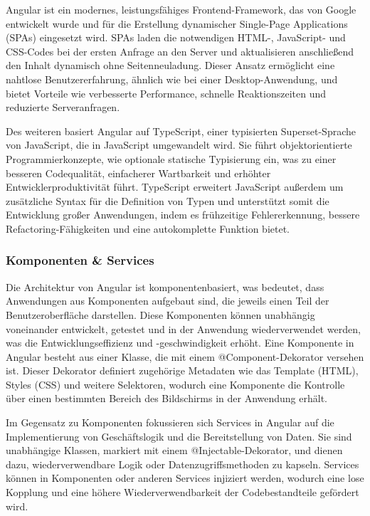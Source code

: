 \documentclass[../main.tex]{subfiles} %
\begin{document}
Angular ist ein modernes, leistungsfähiges Frontend-Framework, das von Google entwickelt wurde und für die Erstellung dynamischer Single-Page 
Applications (SPAs) eingesetzt wird. SPAs laden die notwendigen HTML-, JavaScript- und CSS-Codes bei der ersten Anfrage an den Server und 
aktualisieren anschließend den Inhalt dynamisch ohne Seitenneuladung. Dieser Ansatz ermöglicht eine nahtlose Benutzererfahrung, ähnlich wie bei 
einer Desktop-Anwendung, und bietet Vorteile wie verbesserte Performance, schnelle Reaktionszeiten und reduzierte Serveranfragen.

Des weiteren basiert Angular auf TypeScript, einer typisierten Superset-Sprache von JavaScript, die in JavaScript umgewandelt wird. Sie führt 
objektorientierte Programmierkonzepte, wie optionale statische Typisierung ein, was zu einer besseren Codequalität, einfacherer Wartbarkeit und 
erhöhter Entwicklerproduktivität führt. TypeScript erweitert JavaScript außerdem um zusätzliche Syntax für die Definition von Typen und unterstützt 
somit die Entwicklung großer Anwendungen, indem es frühzeitige Fehlererkennung, bessere Refactoring-Fähigkeiten und eine autokomplette Funktion bietet.

\subsubsection{Komponenten \& Services}

Die Architektur von Angular ist komponentenbasiert, was bedeutet, dass Anwendungen aus Komponenten aufgebaut sind, die
jeweils einen Teil der Benutzeroberfläche darstellen. Diese Komponenten können unabhängig voneinander entwickelt, getestet und in der
Anwendung wiederverwendet werden, was die Entwicklungseffizienz und -geschwindigkeit erhöht. Eine Komponente in Angular besteht aus einer 
Klasse, die mit einem @Component-Dekorator versehen ist. Dieser Dekorator definiert zugehörige Metadaten wie das Template (HTML), Styles (CSS) 
und weitere Selektoren, wodurch eine Komponente die Kontrolle über einen bestimmten Bereich des Bildschirms in der Anwendung erhält.

Im Gegensatz zu Komponenten fokussieren sich Services in Angular auf die Implementierung von Geschäftslogik und die Bereitstellung von Daten. 
Sie sind unabhängige Klassen, markiert mit einem @Injectable-Dekorator, und dienen dazu, wiederverwendbare Logik oder Datenzugriffsmethoden zu 
kapseln. Services können in Komponenten oder anderen Services injiziert werden, wodurch eine lose Kopplung und eine höhere Wiederverwendbarkeit 
der Codebestandteile gefördert wird.
\end{document}
